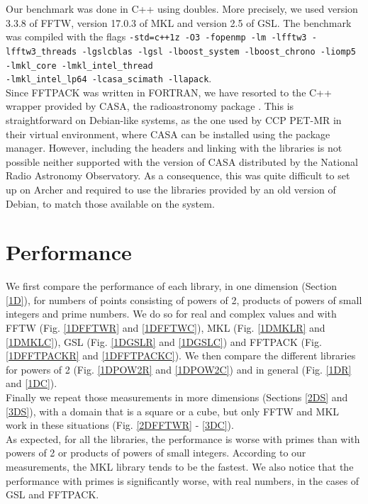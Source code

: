 \documentclass[12pt, a4paper]{article}
\begin{document}
Our benchmark was done in C++ using doubles. More precisely, we used version 3.3.8 of FFTW, version 17.0.3 of MKL and version 2.5 of GSL. The benchmark was compiled with the flags \texttt{-std=c++1z -O3  -fopenmp   -lm -lfftw3 -lfftw3\_threads -lgslcblas -lgsl -lboost\_system -lboost\_chrono -liomp5 -lmkl\_core -lmkl\_intel\_thread \\-lmkl\_intel\_lp64  -lcasa\_scimath  -llapack}.\\

Since FFTPACK was written in FORTRAN, we have resorted to the C++ wrapper provided by CASA, the radioastronomy package \cite{casa}. This is straightforward on Debian-like systems, as the one used by CCP PET-MR in their virtual environment, where CASA can be installed using the package manager. However, including the headers and linking with the libraries is not possible neither supported with the version of CASA distributed by the National Radio Astronomy Observatory. As a consequence, this was quite difficult to set up on Archer and required to use the libraries provided by an old version of Debian, to match those available on the system.

\pagebreak
\section{Performance}

We first compare the performance of each library, in one dimension (Section \ref{1D}), for numbers of points consisting of powers of 2, products of powers of small integers and prime numbers. We do so for real and complex values and with FFTW (Fig. \ref{1DFFTWR} and \ref{1DFFTWC}), MKL (Fig. \ref{1DMKLR} and \ref{1DMKLC}), GSL (Fig. \ref{1DGSLR} and \ref{1DGSLC}) and FFTPACK (Fig. \ref{1DFFTPACKR} and \ref{1DFFTPACKC}). We then compare the different libraries for powers of 2 (Fig. \ref{1DPOW2R} and \ref{1DPOW2C}) and in general (Fig. \ref{1DR} and \ref{1DC}).\\

Finally we repeat those measurements in more dimensions (Sections \ref{2DS} and \ref{3DS}), with a domain that is a square or a cube, but only FFTW and MKL work in these situations (Fig. \ref{2DFFTWR} - \ref{3DC}).\\

As expected, for all the libraries, the performance is worse with primes than with powers of 2 or products of powers of small integers. According to our measurements, the MKL library tends to be the fastest. We also notice that the performance with primes is significantly worse, with real numbers, in the cases of GSL and FFTPACK.
\end{document}
